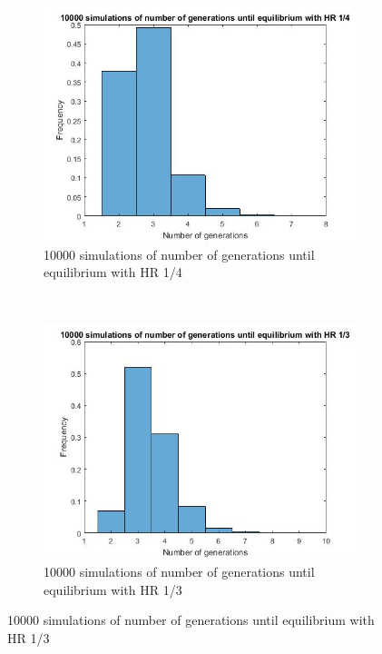 \begin{figure}[H]
    \centering
    \begin{subfigure}{0.4\textwidth}
        \includegraphics[width=\textwidth]{GenormHistogramAantalgen4}
        \caption{10000 simulations of number of generations until equilibrium with HR 1/4}
        \label{fig:gull}
    \end{subfigure}
    ~ %
    \begin{subfigure}{0.4\textwidth}
        \includegraphics[width=\textwidth]{GenormHistogramAantalgen}
        \caption{10000 simulations of number of generations until equilibrium with HR 1/3}
        \label{fig:tiger}

\end{subfigure}
\end{figure}
